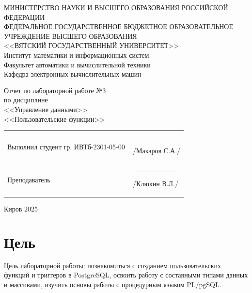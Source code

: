 \documentclass[a4paper,14pt]{extarticle}
\begin{document}
  \newpage\thispagestyle{empty}
  \begin{center}
    \MakeUppercase{
      Министерство науки и высшего образования Российской Федерации\\
      Федеральное государственное бюджетное образовательное учреждение высшего образования\\
      <<Вятский Государственный Университет>>\\
    }
    Институт математики и информационных систем\\
    Факультет автоматики и вычислительной техники\\
    Кафедра электронных вычислительных машин
  \end{center}
  \vfill

  \begin{center}
    Отчет по лабораторной работе №3\\
    по дисциплине\\
    <<Управление данными>>\\
    <<Пользовательские функции>>\\
  \end{center}
  \vfill

  \noindent
  \begin{tabular}{ll}
    Выполнил студент гр. ИВТб-2301-05-00 \hspace{5mm} &
    \rule[-1mm]{25mm}{0.10mm}\,/Макаров С.А./\\
    
    Преподаватель & \rule[-1mm]{25mm}{0.10mm}\,/Клюкин В.Л./\\
  \end{tabular}

  \vfill
  \begin{center}
    Киров 2025
  \end{center}

  \newpage
  \section*{Цель}
  Цель лабораторной работы: познакомиться с созданием пользовательских функций и триггеров в PostgreSQL, освоить работу с составными типами данных и массивами, изучить основы работы с процедурным языком PL/pgSQL.
\end{document}
